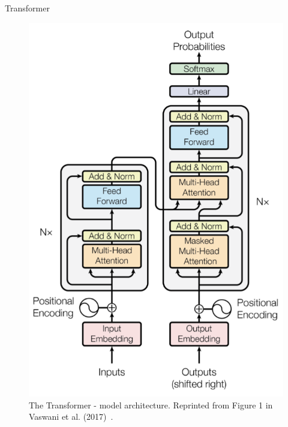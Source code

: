 \documentclass[12pt]{beamer}
\begin{document}
\begin{frame}[allowframebreaks]{Transformer}
    \begin{figure}
        \centering
        \includegraphics[height=0.6\textheight]{figures/transformer_architecture.png}
        \caption{The Transformer - model architecture. Reprinted from Figure 1 in Vaswani et al. (2017)~\cite{vaswani2017attention}.}
        \label{fig:Fig. 1}
    \end{figure}
\end{frame}
\end{document}
